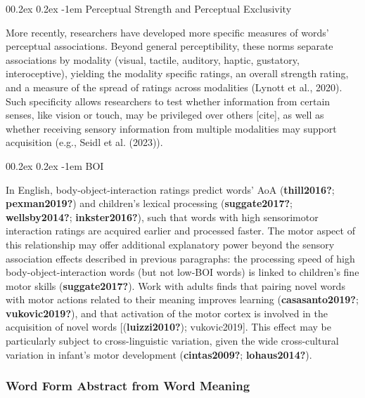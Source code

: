 \documentclass[
  man,floatsintext]{apa6}
\makeatletter
\let\oldparagraph\paragraph
\renewcommand{\paragraph}[1]{\oldparagraph{#1}\mbox{}}
\renewcommand{\paragraph}{\@startsection{paragraph}{4}{\parindent}%
  {0\baselineskip \@plus 0.2ex \@minus 0.2ex}%
  {-1em}%
  {\normalfont\normalsize\bfseries\itshape\typesectitle}}
\makeatother
\begin{document}
\hypertarget{perceptual-strength-and-perceptual-exclusivity}{%
\paragraph{Perceptual Strength and Perceptual Exclusivity}\label{perceptual-strength-and-perceptual-exclusivity}}

More recently, researchers have developed more specific measures of words' perceptual associations. Beyond general perceptibility, these norms separate associations by modality (visual, tactile, auditory, haptic, gustatory, interoceptive), yielding the modality specific ratings, an overall strength rating, and a measure of the spread of ratings across modalities (Lynott et al., 2020). Such specificity allows researchers to test whether information from certain senses, like vision or touch, may be privileged over others {[}cite{]}, as well as whether receiving sensory information from multiple modalities may support acquisition (e.g., Seidl et al. (2023)).

\hypertarget{boi}{%
\paragraph{BOI}\label{boi}}

In English, body-object-interaction ratings predict words' AoA (\textbf{thill2016?}; \textbf{pexman2019?}) and children's lexical processing (\textbf{suggate2017?}; \textbf{wellsby2014?}; \textbf{inkster2016?}), such that words with high sensorimotor interaction ratings are acquired earlier and processed faster. The motor aspect of this relationship may offer additional explanatory power beyond the sensory association effects described in previous paragraphs: the processing speed of high body-object-interaction words (but not low-BOI words) is linked to children's fine motor skills (\textbf{suggate2017?}). Work with adults finds that pairing novel words with motor actions related to their meaning improves learning (\textbf{casasanto2019?}; \textbf{vukovic2019?}), and that activation of the motor cortex is involved in the acquisition of novel words {[}(\textbf{luizzi2010?}); vukovic2019{]}. This effect may be particularly subject to cross-linguistic variation, given the wide cross-cultural variation in infant's motor development (\textbf{cintas2009?}; \textbf{lohaus2014?}).

\hypertarget{word-form-abstract-from-word-meaning}{%
\subsubsection{Word Form Abstract from Word Meaning}\label{word-form-abstract-from-word-meaning}}
\end{document}
